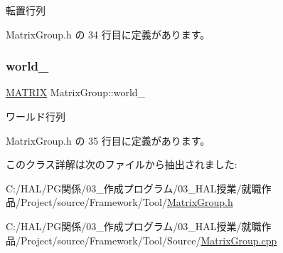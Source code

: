 転置行列 



 Matrix\+Group.\+h の 34 行目に定義があります。

\mbox{\label{class_matrix_group_a098fd7ddc68b1d9191ded4bb7bc0d187}} 
\subsubsection{\texorpdfstring{world\+\_\+}{world\_}}
{\footnotesize\ttfamily \mbox{\hyperlink{_matrix_8h_a032295cd9fb1b711757c90667278e744}{M\+A\+T\+R\+IX}} Matrix\+Group\+::world\+\_\+\hspace{0.3cm}{\ttfamily [private]}}



ワールド行列 



 Matrix\+Group.\+h の 35 行目に定義があります。



このクラス詳解は次のファイルから抽出されました\+:\begin{DoxyCompactItemize}
\item 
C\+:/\+H\+A\+L/\+P\+G関係/03\+\_\+作成プログラム/03\+\_\+\+H\+A\+L授業/就職作品/\+Project/source/\+Framework/\+Tool/\mbox{\hyperlink{_matrix_group_8h}{Matrix\+Group.\+h}}\item 
C\+:/\+H\+A\+L/\+P\+G関係/03\+\_\+作成プログラム/03\+\_\+\+H\+A\+L授業/就職作品/\+Project/source/\+Framework/\+Tool/\+Source/\mbox{\hyperlink{_matrix_group_8cpp}{Matrix\+Group.\+cpp}}\end{DoxyCompactItemize}
